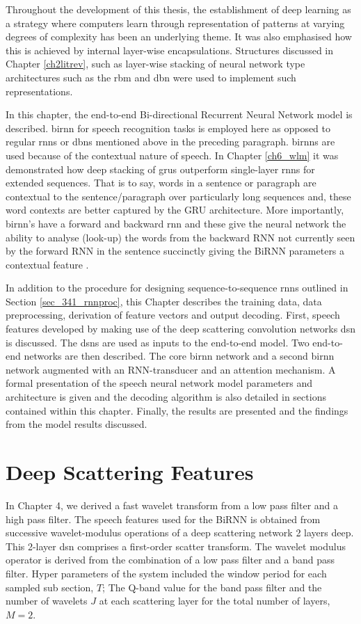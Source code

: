
Throughout the development of this thesis, the establishment of deep learning as a strategy where computers learn through representation of patterns at varying degrees of complexity has been an underlying theme.  It was also emphasised how this is achieved by internal layer-wise encapsulations. Structures discussed in Chapter \ref{ch2litrev}, such as layer-wise stacking of neural network type architectures such as the \acrfull{rbm} and \acrfull{dbn} were used to implement such representations.  

In this chapter, the end-to-end Bi-directional Recurrent Neural Network model is described.  \acrshort{birnn} for speech recognition tasks is  employed here as opposed to regular \acrshort{rnn}s or \acrshort{dbn}s mentioned above in the preceding paragraph.  \acrshort{birnn}s are used because of the contextual nature of speech.  In Chapter \ref{ch6_wlm} it was demonstrated  how deep stacking of \acrshort{gru}s outperform single-layer \acrshort{rnn}s for extended sequences. That is to say, words in a sentence or paragraph are contextual to the sentence/paragraph over particularly long sequences and, these word contexts are better captured by the GRU architecture.  More importantly, \acrshort{birnn}'s have a forward and backward \acrshort{rnn} and these give the neural network the ability to analyse (look-up) the words from the backward RNN not currently seen by the forward RNN in the sentence succinctly giving the BiRNN parameters a contextual feature \citep{graves2006connectionist}.  

In addition to the procedure for designing sequence-to-sequence \acrshort{rnn}s outlined in Section \ref{sec_341_rnnproc}, this Chapter describes the training data, data preprocessing, derivation of feature vectors and output decoding.  First, speech features developed by making use of the deep scattering convolution networks \acrshort{dsn} is discussed.   The \acrshort{dsn}s are used as inputs to the end-to-end model.  Two end-to-end networks are then described.  The core \acrshort{birnn} network and a second \acrshort{birnn} network augmented with an RNN-transducer and an attention mechanism. A formal presentation of the speech neural network model parameters and architecture is given and the decoding algorithm is also detailed in sections contained within this chapter.  Finally, the results are presented and the findings from the model results discussed.

\section{Deep Scattering Features}\label{sec_c7_wparams}
In Chapter 4, we derived a fast wavelet transform from a low pass filter and a high pass filter.  The speech features used for the BiRNN is obtained from successive wavelet-modulus operations of a deep scattering network 2 layers deep.  This 2-layer \acrshort{dsn} comprises a first-order scatter transform. The wavelet modulus operator is derived from the combination of a low pass filter and a band pass filter.  Hyper parameters of the system included the window period for each sampled sub section, $T$;  The Q-band value for the band pass filter and the number of wavelets $J$ at each scattering layer for the total number of layers, $M=2$.

